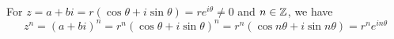 \begin{theorem}
    For $z = a + b i = r(\cos \theta + i \sin \theta) = r e^{i \theta} \neq 0$ and $n \in \mathbb{Z}$, we have 
    \begin{equation}
        z^n = (a+bi)^n = r^n(\cos \theta + i \sin \theta)^n = r^n (\cos n\theta + i \sin n\theta) = r^n e^{in\theta}
    \end{equation}
\end{theorem}




































































































